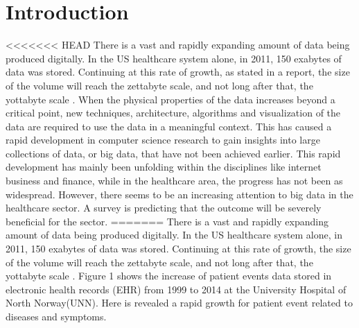 \section{Introduction}
<<<<<<< HEAD
There is a vast and rapidly expanding amount of data being produced digitally. In the US healthcare system alone, in 2011, 150 exabytes of data was stored. Continuing at this rate of growth, as stated in a report, the size of the volume will reach the zettabyte scale, and not long after that, the yottabyte scale \cite{intro}. When the physical properties of the data increases beyond a critical point, new techniques, architecture, algorithms and visualization of the data are required to use the data in a meaningful context. This has caused a rapid development in computer science research to gain insights into large collections of data, or big data, that have not been achieved earlier. This rapid development has mainly been unfolding within the disciplines like internet business and finance, while in the healthcare area, the progress has not been as widespread. However, there seems to be an increasing attention to big data in the healthcare sector. A survey is predicting that the outcome will be severely beneficial for the sector.\cite{gg}
=======
There is a vast and rapidly expanding amount of data being produced digitally. In the US healthcare system alone, in 2011, 150 exabytes of data was stored. Continuing at this rate of growth, the size of the volume will reach the zettabyte scale, and not long after that, the yottabyte scale \cite{intro}. 
Figure 1 shows the increase of patient events data stored in electronic health records (EHR) from 1999 to 2014 at the University Hospital of North Norway(UNN). Here is revealed a rapid growth for patient event related to diseases and symptoms.    


